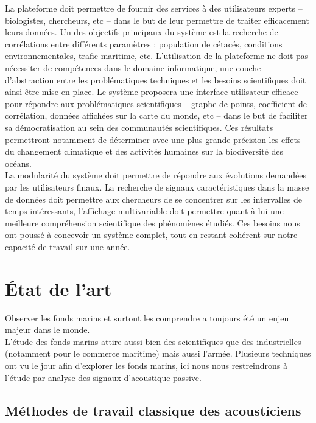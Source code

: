 \documentclass[a4paper]{article}
\begin{document}
La plateforme doit permettre de fournir des services à des utilisateurs experts –
biologistes, chercheurs, etc – dans le but de leur permettre de traiter efficacement leurs données.
Un des objectifs principaux du système est la recherche de corrélations entre différents
paramètres : population de cétacés, conditions environnementales, trafic maritime, etc.
L’utilisation de la plateforme ne doit pas nécessiter de compétences dans le domaine
informatique, une couche d’abstraction entre les problématiques techniques et les besoins
scientifiques doit ainsi être mise en place. Le système proposera une interface utilisateur efficace
pour répondre aux problématiques scientifiques – graphe de points, coefficient de corrélation,
données affichées sur la carte du monde, etc – dans le but de faciliter sa démocratisation au sein
des communautés scientifiques. Ces résultats permettront notamment de déterminer avec une
plus grande précision les effets du changement climatique et des activités humaines sur la
biodiversité des océans.
\\

La modularité du système doit permettre de répondre aux évolutions demandées par les
utilisateurs finaux. La recherche de signaux caractéristiques dans la masse de données doit
permettre aux chercheurs de se concentrer sur les intervalles de temps intéressants, l’affichage
multivariable doit permettre quant à lui une meilleure compréhension scientifique des
phénomènes étudiés. Ces besoins nous ont poussé à concevoir un système complet, tout en
restant cohérent sur notre capacité de travail sur une année.

\section{État de l’art}

Observer les fonds marins et surtout les comprendre a toujours été un enjeu majeur dans le
monde.
\\

L’étude des fonds marins attire aussi bien des scientifiques que des industrielles (notamment
pour le commerce maritime) mais aussi l’armée. Plusieurs techniques ont vu le jour afin
d’explorer les fonds marins, ici nous nous restreindrons à l’étude par analyse des signaux
d’acoustique passive.

\subsection{Méthodes de travail classique des acousticiens}
\end{document}
